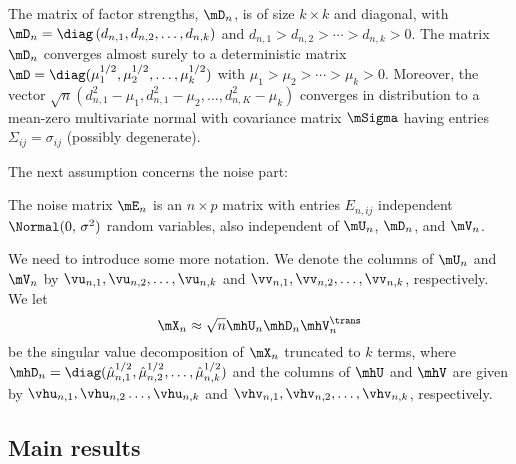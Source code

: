 \begin{assumption}\label{A:sizes}
    The matrix of factor strengths, $\mD_n$, is of size $k\times k$ and 
    diagonal, with 
    \(
        \mD_n = \diag \left( d_{n,1}, d_{n,2}, \ldots, d_{n,k} \right)
    \)
    and
    $d_{n,1} > d_{n,2} > \cdots > d_{n,k} > 0$.  The matrix $\mD_n$ converges
    almost surely to a deterministic matrix 
    $\mD = \diag( \mu_1^{1/2}, \mu_2^{1/2}, \ldots, \mu_k^{1/2})$ with
    $\mu_1 > \mu_2 > \cdots > \mu_k > 0$. Moreover, the vector
    \(
        \sqrt{n} ( d_{n,1}^2 - \mu_1, d_{n,1}^2 - \mu_2, 
                   \ldots, 
                   d_{n,K}^2 - \mu_k )
    \)
    converges in distribution to a mean-zero multivariate normal with 
    covariance matrix $\mSigma$ having entries $\Sigma_{ij} = \sigma_{ij}$
    (possibly degenerate).
\end{assumption}
\noindent
The next assumption concerns the noise part:

\begin{assumption}\label{A:noise}
    The noise matrix $\mE_n$ is an $n\times p$ matrix with entries 
    $E_{n,ij}$ independent $\Normal(0,\, \sigma^2)$ random variables, also
    independent of $\mU_n$, $\mD_n$, and $\mV_n$.
\end{assumption}
\noindent

We need to introduce some more notation. We denote the columns of $\mU_n$ and
$\mV_n$ by $\vu_{n,1}, \vu_{n,2}, \ldots, \vu_{n,k}$ and $\vv_{n,1},
\vv_{n,2}, \ldots, \vv_{n,k}$, respectively. We let 
\[
    \mX_n \approx \sqrt{n} \mhU_n \mhD_n \mhV_n^\trans
\]
be the singular value decomposition of
$\mX_n$ truncated to $k$ terms, where $\mhD_n = \diag( \hat \mu_{n,1}^{1/2},
\hat \mu_{n,2}^{1/2}, \ldots, \hat \mu_{n,k}^{1/2})$ and the columns of $\mhU$ and $\mhV$ are given
by $\vhu_{n,1}, \vhu_{n,2} \ldots, \vhu_{n,k}$ and $\vhv_{n,1}, \vhv_{n,2},
\ldots, \vhv_{n,k}$, respectively.


\subsection{Main results}

